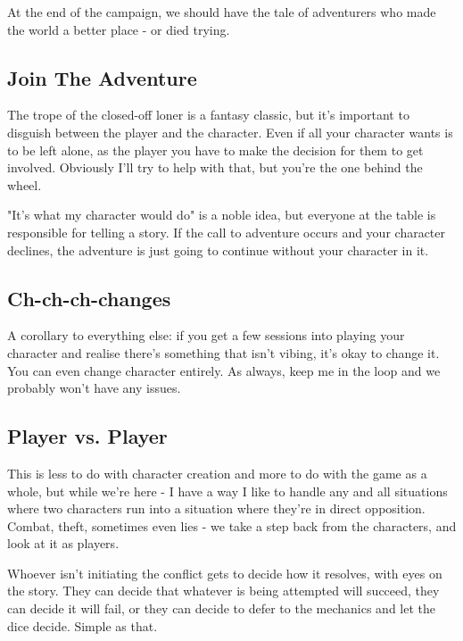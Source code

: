 At the end of the campaign, we should have the tale of adventurers who made the world a better place - or died trying.

\subsection {Join The Adventure}

The trope of the closed-off loner is a fantasy classic, but it's important to disguish between the player and the character. Even if all your character wants is to be left alone, as the player you have to make the decision for them to get involved. Obviously I'll try to help with that, but you're the one behind the wheel.

"It's what my character would do" is a noble idea, but everyone at the table is responsible for telling a story. If the call to adventure occurs and your character declines, the adventure is just going to continue without your character in it.

\subsection {Ch-ch-ch-changes}

A corollary to everything else: if you get a few sessions into playing your character and realise there's something that isn't vibing, it's okay to change it. You can even change character entirely. As always, keep me in the loop and we probably won't have any issues.

\subsection {Player vs. Player}

This is less to do with character creation and more to do with the game as a whole, but while we're here - I have a way I like to handle any and all situations where two characters run into a situation where they're in direct opposition. Combat, theft, sometimes even lies - we take a step back from the characters, and look at it as players.

Whoever isn't initiating the conflict gets to decide how it resolves, with eyes on the story. They can decide that whatever is being attempted will succeed, they can decide it will fail, or they can decide to defer to the mechanics and let the dice decide. Simple as that.
